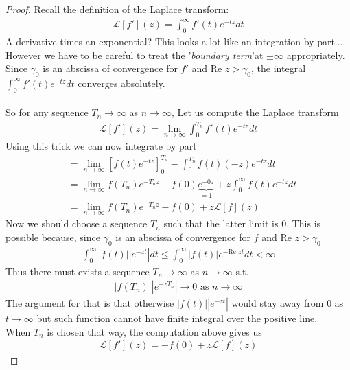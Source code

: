 \begin{proof}

Recall the definition of the Laplace transform:
\begin{align*} 
	\mathcal{L}\left[f'\right]\left(z\right) = \int_{0}^{\infty} f'\left(t\right)e^{-tz}dt
\end{align*}
A derivative times an exponential? This looks a lot like an integration by part... However we have to be careful to treat the '\textit{boundary term}'at $\pm \infty$ appropriately. Since $\gamma_0$ is an abscissa of convergence for $f'$ and $\text{Re }z > \gamma_0$, the integral $\int_0^{\infty}f'\left(t\right)e^{-tz}dt$ converges absolutely.\\
$ $\\
So for any sequence $T_n \to \infty$ as $n \to \infty$, Let us compute the Laplace transform 
\begin{align*} 
	\mathcal{L}\left[f'\right]\left(z\right) =  \lim_{n \to \infty} \int_0^{T_n}f'\left(t\right)e^{-tz}dt
\end{align*}
Using this trick we can now integrate by part
\begin{align*} 
	&= \lim_{n \to \infty}  \left[f\left(t\right)e^{-tz}\right]_0^{T_n} - \int_0^{T_n}f\left(t\right)\left(-z\right)e^{-tz}dt\\
	&= \lim_{n \to \infty} f\left(T_n\right)e^{-T_nz} - f\left(0\right)\underbrace{e^{-0z}}_{= 1} + z \int_0^{\infty}f\left(t\right)e^{-tz}dt\\
	&= \lim_{n \to \infty} f\left(T_n\right)e^{-T_nz} - f\left(0\right) + z\mathcal{L}\left[f\right]\left(z\right)
\end{align*}
Now we should choose a sequence $T_n$ such that the latter limit is $0$. This is possible because, since $\gamma_0$ is an abscissa of convergence for $f$ and $\text{Re }z > \gamma_0$
\begin{align*} 
	\int_0^{\infty}\left|f\left(t\right)\right|\left|e^{-zt}\right|dt \leq \int_0^{\infty}\left|f\left(t\right)\right|e^{- \text{Re }z t}dt < \infty
\end{align*}
Thus there must exists a sequence $T_n \to \infty$ as $n \to \infty$ s.t. 
\begin{align*} 
	\left|f\left(T_n\right)\right|\left|e^{-zT_n}\right| \to 0 \text{ as } n \to \infty
\end{align*}
The argument for that is that otherwise $\left|f\left(t\right)\right|\left|e^{-zt}\right|$ would stay away from $0$ as $t \to \infty$ but such function cannot have finite integral over the positive line.\\
When $T_n$ is chosen that way, the computation above gives us 
\begin{align*} 
	\mathcal{L}\left[f'\right]\left(z\right)= -f\left(0\right) + z \mathcal{L}\left[f\right]\left(z\right)
\end{align*}

\end{proof}
